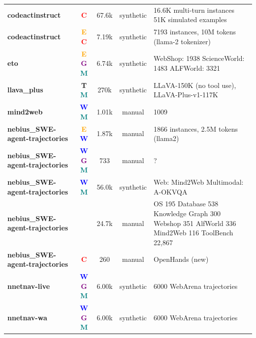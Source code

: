\begin{table}[t]
\begin{tabular*}{\textwidth}{@{\extracolsep{\fill}}l c c c p{5cm}}
        \textbf{codeactinstruct \cite{opencodeinterpreter__2402_14658}} & \textcolor{red}{\textbf{C}} & 67.6k & synthetic & 16.6K multi-turn instances
51K simulated examples \\
        \textbf{codeactinstruct \cite{executable_code_acti_2402_01030}} & \textcolor{orange}{\textbf{E}} \textcolor{red}{\textbf{C}} & 7.19k & synthetic & 7193 instances, 10M tokens (llama-2 tokenizer) \\
        \textbf{eto \cite{trial_and_error_expl_2403_02502}} & \textcolor{orange}{\textbf{E}} \textcolor{purple}{\textbf{G}} \textcolor{teal}{\textbf{M}} & 6.74k & synthetic & WebShop: 1938
ScienceWorld: 1483
ALFWorld: 3321 \\
        \textbf{llava\_plus \cite{llava_plus_learning__2311_05437}} & \textcolor{green!60!black}{\textbf{T}} \textcolor{teal}{\textbf{M}} & 270k & synthetic & LLaVA-150K (no tool use), LLaVA-Plus-v1-117K \\
        \textbf{mind2web \cite{mind2web_towards_a_g_2306_06070}} & \textcolor{blue}{\textbf{W}} \textcolor{teal}{\textbf{M}} & 1.01k & manual & 1009 \\
        \textbf{nebius\_SWE-agent-trajectories \cite{agenttuning_enabling_2310_12823}} & \textcolor{orange}{\textbf{E}} \textcolor{blue}{\textbf{W}} & 1.87k & manual & 1866 instances, 2.5M tokens (llama2) \\
        \textbf{nebius\_SWE-agent-trajectories \cite{webvoyager_building__2401_13919}} & \textcolor{blue}{\textbf{W}} \textcolor{purple}{\textbf{G}} \textcolor{teal}{\textbf{M}} & 733 & manual & ? \\
        \textbf{nebius\_SWE-agent-trajectories \cite{agent_lumos_unified__2311_05657}} & \textcolor{blue}{\textbf{W}} \textcolor{teal}{\textbf{M}} & 56.0k & synthetic & Web: Mind2Web
Multimodal: A-OKVQA \\
        \textbf{nebius\_SWE-agent-trajectories \cite{agent_flan_designing_2403_12881}} &  & 24.7k & manual & OS 195
Database 538
Knowledge Graph 300
Webshop 351
AlfWorld 336
Mind2Web 116
ToolBench 22,867 \\
        \textbf{nebius\_SWE-agent-trajectories} & \textcolor{red}{\textbf{C}} & 260 & manual & OpenHands (new) \\
        \textbf{nnetnav-live \cite{nnetscape_navigator__2410_02907}} & \textcolor{blue}{\textbf{W}} \textcolor{purple}{\textbf{G}} \textcolor{teal}{\textbf{M}} & 6.00k & synthetic & 6000 WebArena trajectories \\
        \textbf{nnetnav-wa \cite{nnetscape_navigator__2410_02907}} & \textcolor{blue}{\textbf{W}} \textcolor{purple}{\textbf{G}} \textcolor{teal}{\textbf{M}} & 6.00k & synthetic & 6000 WebArena trajectories \\

\end{tabular*}
\end{table}
